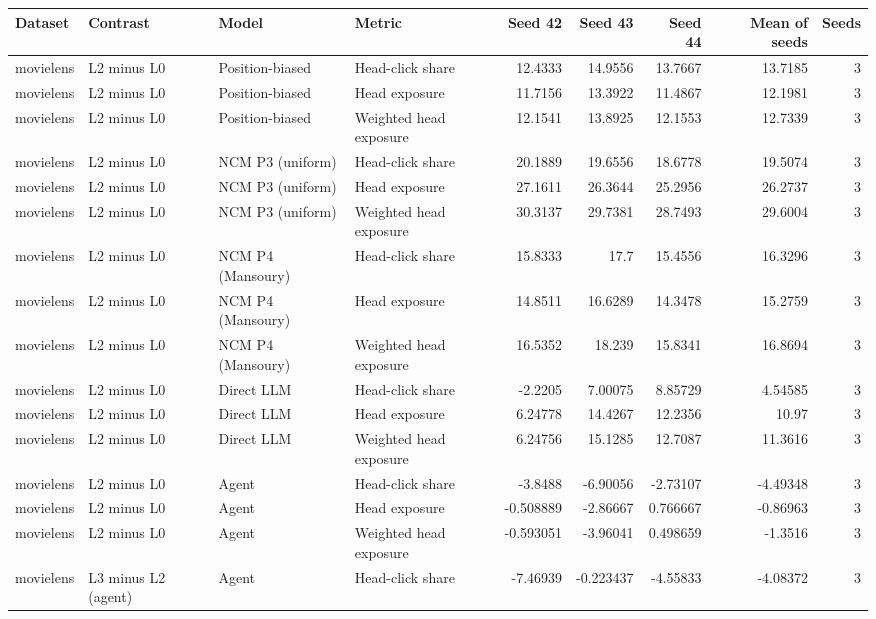 \begin{table}[htbp!]
\centering
\small
\setlength{\tabcolsep}{3pt}
\renewcommand{\arraystretch}{1.1}
\begin{tabular}{llllrrrrr}
\hline
Dataset & Contrast & Model & Metric & Seed 42 & Seed 43 & Seed 44 & Mean of seeds & Seeds \\
\hline
movielens & L2 minus L0 & Position-biased & Head-click share & 12.4333 & 14.9556 & 13.7667 & 13.7185 & 3 \\
movielens & L2 minus L0 & Position-biased & Head exposure & 11.7156 & 13.3922 & 11.4867 & 12.1981 & 3 \\
movielens & L2 minus L0 & Position-biased & Weighted head exposure & 12.1541 & 13.8925 & 12.1553 & 12.7339 & 3 \\
movielens & L2 minus L0 & NCM P3 (uniform) & Head-click share & 20.1889 & 19.6556 & 18.6778 & 19.5074 & 3 \\
movielens & L2 minus L0 & NCM P3 (uniform) & Head exposure & 27.1611 & 26.3644 & 25.2956 & 26.2737 & 3 \\
movielens & L2 minus L0 & NCM P3 (uniform) & Weighted head exposure & 30.3137 & 29.7381 & 28.7493 & 29.6004 & 3 \\
movielens & L2 minus L0 & NCM P4 (Mansoury) & Head-click share & 15.8333 & 17.7 & 15.4556 & 16.3296 & 3 \\
movielens & L2 minus L0 & NCM P4 (Mansoury) & Head exposure & 14.8511 & 16.6289 & 14.3478 & 15.2759 & 3 \\
movielens & L2 minus L0 & NCM P4 (Mansoury) & Weighted head exposure & 16.5352 & 18.239 & 15.8341 & 16.8694 & 3 \\
movielens & L2 minus L0 & Direct LLM & Head-click share & -2.2205 & 7.00075 & 8.85729 & 4.54585 & 3 \\
movielens & L2 minus L0 & Direct LLM & Head exposure & 6.24778 & 14.4267 & 12.2356 & 10.97 & 3 \\
movielens & L2 minus L0 & Direct LLM & Weighted head exposure & 6.24756 & 15.1285 & 12.7087 & 11.3616 & 3 \\
movielens & L2 minus L0 & Agent & Head-click share & -3.8488 & -6.90056 & -2.73107 & -4.49348 & 3 \\
movielens & L2 minus L0 & Agent & Head exposure & -0.508889 & -2.86667 & 0.766667 & -0.86963 & 3 \\
movielens & L2 minus L0 & Agent & Weighted head exposure & -0.593051 & -3.96041 & 0.498659 & -1.3516 & 3 \\
movielens & L3 minus L2 (agent) & Agent & Head-click share & -7.46939 & -0.223437 & -4.55833 & -4.08372 & 3 \\

\end{tabular}
\end{table}
